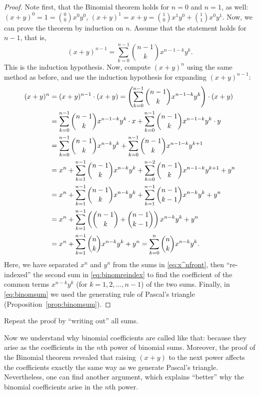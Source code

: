 \begin{proof}%
Note first, that the Binomial theorem holds for $n=0$ and $n=1$, as well: 
$(x+y)^0 = 1 = \binom{0}{0} x^0 y^0$, 
$(x+y)^1 = x + y = \binom{1}{0} x^1 y^0 + \binom{1}{1} x^0 y^1$. 
Now, we can prove the theorem by induction on $n$. 
Assume that the statement holds for $n-1$, 
that is, 
\[
(x+y)^{n-1} = \sum_{k=0}^{n-1} \binom{n-1}{k} x^{n-1-k}y^k. 
\]
This is the induction hypothesis. 
Now, compute $(x+y)^n$ using the same method as before, 
and use the induction hypothesis for expanding $(x+y)^{n-1}$: 
\begin{align}
\notag (x+y)^n &= (x+y)^{n-1} \cdot (x+y) = \left( \sum_{k=0}^{n-1} \binom{n-1}{k} x^{n-1-k}y^k \right) \cdot \left( x + y \right) \\
\notag &= \sum_{k=0}^{n-1} \binom{n-1}{k} x^{n-1-k}y^k \cdot x + \sum_{k=0}^{n-1} \binom{n-1}{k} x^{n-1-k}y^k \cdot y \\
\label{eq:x^nfront} &= \sum_{k=0}^{n-1} \binom{n-1}{k} x^{n-k}y^k + \sum_{k=0}^{n-1} \binom{n-1}{k} x^{n-1-k}y^{k+1} \\
\label{eq:binomreindex} &= x^n + \sum_{k=1}^{n-1} \binom{n-1}{k} x^{n-k}y^k + \sum_{k=0}^{n-2} \binom{n-1}{k} x^{n-1-k}y^{k+1} + y^n \\
\notag &= x^n + \sum_{k=1}^{n-1} \binom{n-1}{k} x^{n-k}y^k + \sum_{k=1}^{n-1} \binom{n-1}{k-1} x^{n-k}y^k + y^n \\
\label{eq:binomsum} &= x^n + \sum_{k=1}^{n-1} \left( \binom{n-1}{k} + \binom{n-1}{k-1}\right) x^{n-k}y^k + y^n \\
\notag &= x^n + \sum_{k=1}^{n-1} \binom{n}{k} x^{n-k}y^k + y^n = \sum_{k=0}^n \binom{n}{k} x^{n-k}y^k. 
\end{align}
Here, we have separated $x^n$ and $y^n$ from the sums in \eqref{eq:x^nfront}, 
then ``re-indexed'' the second sum in \eqref{eq:binomreindex} to find the coefficient of the common terms $x^{n-k}y^k$ (for $k = 1, 2, \dots , n-1$) of the two sums. 
Finally, in \eqref{eq:binomsum} we used the generating rule of Pascal's triangle (Proposition~\ref{prop:binomsum}). 
\end{proof}

\begin{exercise}\label{ex:binomialwriteout}
Repeat the proof by ``writing out'' all sums. 
\end{exercise}

Now we understand why binomial coefficients are called like that: 
because they arise as the coefficients in the $n$th power of binomial sums. 
Moreover, 
the proof of the Binomial theorem revealed that raising $(x+y)$ to the next power 
affects the coefficients exactly the same way as we generate Pascal's triangle. 
Nevertheless, 
one can find another argument, which explains ``better'' why the binomial coefficients arise in the $n$th power. 

